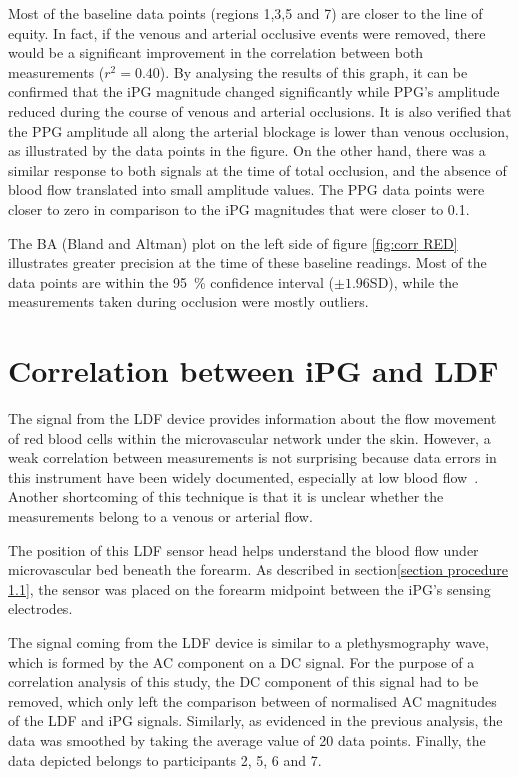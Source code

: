 Most of the baseline data points (regions 1,3,5 and 7) are closer to the line of equity. In fact, if the venous and arterial occlusive events were removed, there would be a significant improvement in the correlation between both measurements ($r^2 = 0.40$). By analysing the results of this graph, it can be confirmed that the iPG magnitude changed significantly while PPG's amplitude reduced during the course of venous and arterial occlusions. It is also verified that the PPG amplitude all along the arterial blockage is lower than venous occlusion, as illustrated by the data points in the figure. On the other hand, there was a similar response to both signals at the time of total occlusion, and the absence of blood flow translated into small amplitude values. The PPG data points were closer to zero in comparison to the iPG magnitudes that were closer to \num{0.1}.

The BA (Bland and Altman) plot on the left side of figure \ref{fig:corr RED} illustrates greater precision at the time of these baseline readings. Most of the data points are within the \SI{95}{\percent} confidence interval ($\pm 1.96$SD), while the measurements taken during occlusion were mostly outliers.

\section{Correlation between iPG and LDF}  %
\label{section correlation 4}
The signal from the LDF device provides information about the flow movement of red blood cells within the microvascular network under the skin. However, a weak correlation between measurements is not surprising because data errors in this instrument have been widely documented, especially at low blood flow~\cite{perkash1988difficulties}. Another shortcoming of this technique is that it is unclear whether the measurements belong to a venous or arterial flow. 

The position of this LDF sensor head helps understand the blood flow under microvascular bed beneath the forearm. As described in section\ref{section procedure 1.1}, the sensor was placed on the forearm midpoint between the iPG's sensing electrodes. 

The signal coming from the LDF device is similar to a plethysmography wave, which is formed by the AC component on a DC signal. For the purpose of a correlation analysis of this study, the DC component of this signal had to be removed, which only left the comparison between of normalised AC magnitudes of the LDF and iPG signals. Similarly, as evidenced in the previous analysis, the data was smoothed by taking the average value of 20 data points. Finally, the data depicted belongs to participants 2, 5, 6 and 7.

